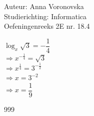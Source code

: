 \documentclass[a4paper]{article}
\begin{document}
  
\noindent \large Auteur: Anna Voronovska \\
\noindent \large Studierichting: Informatica\\
\noindent \large Oefeningenreeks 2E nr. 18.4\\

\medskip

\normalsize

$\log_x \sqrt{3} = -\dfrac{1}{4}$\\

$\Rightarrow x^{-\tfrac{1}{4}} = \sqrt{3}$\\

$\Rightarrow x^{\tfrac{1}{4}} = 3^{-\tfrac{1}{2}}$\\

$\Rightarrow x = 3^{-2}$\\

$\Rightarrow x = \dfrac{1}{9}$

\begin{thebibliography}{999}
\end{thebibliography}
\end{document}
